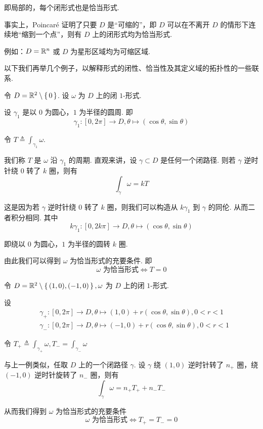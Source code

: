 即局部的，每个闭形式也是恰当形式.

\begin{hint}
    事实上，Poincaré 证明了只要 $D$ 是“可缩的”，即 $D$ 可以在不离开 $D$ 的情形下连续地“缩到一个点”，则有 $D$ 上的闭形式均为恰当形式.

    例如：$D=\mathbb{R}^n$ 或 $D$ 为星形区域均为可缩区域.

\end{hint}

以下我们再举几个例子，以解释形式的闭性、恰当性及其定义域的拓扑性的一些联系.

\begin{example}
    令 $D=\mathbb{R}^2\setminus\set{0}$. 设 $\omega$ 为 $D$ 上的闭 $1$-形式.

    设 $\gamma_1$ 是以 $0$ 为圆心，$1$ 为半径的圆周. 即
$$
\gamma_1:[0,2\pi]\to D,\theta\mapsto(\cos\theta,\sin\theta)
$$


    令 $\displaystyle T\triangleq\int_{\gamma_1}\omega$.

    我们称 $T$ 是 $\omega$ 沿 $\gamma_1$ 的周期. 直观来讲，设 $\gamma\subset D$ 是任何一个闭路径. 则若 $\gamma$ 逆时针绕 $0$ 转了 $k$ 圈，则有
$$
\int_\gamma\omega=kT
$$

    这是因为若 $\gamma$ 逆时针绕 $0$ 转了 $k$ 圈，则我们可以构造从 $k\gamma_1$ 到 $\gamma$ 的同伦. 从而二者积分相同. 其中
$$
k\gamma_1:[0,2k\pi]\to D,\theta\mapsto(\cos\theta,\sin\theta)
$$

    即绕以 $0$ 为圆心，$1$ 为半径的圆转 $k$ 圈.

    由此我们可以得到 $\omega$ 为恰当形式的充要条件. 即
$$
\omega\text{ 为恰当形式}\iff T=0
$$
\end{example}

\begin{example}
    令 $D=\mathbb{R}^2\setminus\set{(1,0),(-1,0)},\omega$ 为 $D$ 上的闭 $1$-形式.


    设
$$
\begin{aligned}
    &\gamma_+:[0,2\pi]\to D,\theta\mapsto(1,0)+r(\cos\theta,\sin\theta),0<r<1\\
    &\gamma_-:[0,2\pi]\to D,\theta\mapsto(-1,0)+r(\cos\theta,\sin\theta),0<r<1
\end{aligned}
$$

    令 $\displaystyle T_+\triangleq\int_{\gamma_+}\omega,T_-=\int_{\gamma_-}\omega$

    与上一例类似，任取 $D$ 上的一个闭路径 $\gamma$. 设 $\gamma$ 绕 $(1,0)$ 逆时针转了 $n_+$ 圈，绕 $(-1,0)$ 逆时针旋转了 $n_-$ 圈，则有
$$
\int_\gamma\omega=n_+T_++n_-T_-
$$

    从而我们得到 $\omega$ 为恰当形式的充要条件
$$
\omega\text{ 为恰当形式}\iff T_+=T_-=0
$$
\end{example}

